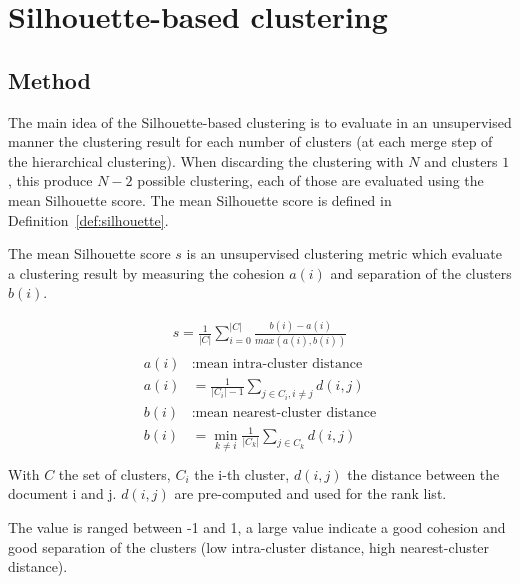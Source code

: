 \section{Silhouette-based clustering\label{sec:silhouette-based_clustering}}

\subsection{Method}

The main idea of the Silhouette-based clustering is to evaluate in an unsupervised manner the clustering result for each number of clusters (at each merge step of the hierarchical clustering).
When discarding the clustering with $N$ and clusters $1$, this produce $N - 2$ possible clustering, each of those are evaluated using the mean Silhouette score.
The mean Silhouette score is defined in Definition~\ref{def:silhouette}.

\begin{definition}
  \label{def:silhouette}
  The mean Silhouette score $s$ is an unsupervised clustering metric which evaluate a clustering result by measuring the cohesion $a(i)$ and separation of the clusters $b(i)$.

  \begin{gather*}
    s = \frac{1}{|C|} \sum_{i = 0}^{|C|} \frac{b(i) - a(i)}{max(a(i), b(i))}
  \end{gather*}
  \begin{gather*}
    \begin{split}
      a(i)&: \text{mean intra-cluster distance} \\
      a(i)& = \frac{1}{|C_i| - 1} \sum_{j \in C_i, i\neq j} d(i, j) \\
      b(i)&: \text{mean nearest-cluster distance} \\
      b(i)& = \min_{k\neq i} \frac{1}{|C_k|} \sum_{j \in C_k} d(i, j) \\
    \end{split}
  \end{gather*}
  With $C$ the set of clusters, $C_i$ the i-th cluster, $d(i, j)$ the distance between the document i and j.
  $d(i, j)$ are pre-computed and used for the rank list.

  The value is ranged between -1 and 1, a large value indicate a good cohesion and good separation of the clusters (low intra-cluster distance, high nearest-cluster distance).
\end{definition}

